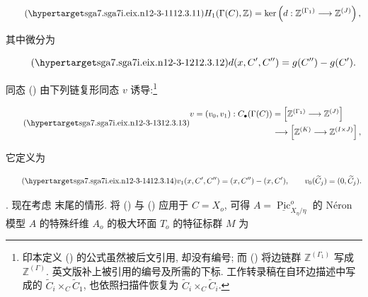 \begin{equation}\tag{\SGARefTarget{sga7.sga7i.eix.n12-3-11}{12.3.11}}
 H_1(\Gamma(C),\mathbb Z)=
 \ker\left(d:\mathbb Z^{(\Gamma_1)}\longrightarrow\mathbb Z^{(J)}\right),
\end{equation}

\noindent
其中微分为

\begin{equation}\tag{\SGARefTarget{sga7.sga7i.eix.n12-3-12}{12.3.12}}
 d(x,C',C'')=g(C'')-g(C').
\end{equation}

同态 () 由下列链复形同态 $v$ 诱导:\footnote{印本定义 () 的公式虽然被后文引用, 却没有编号; 而 () 将边链群 $\mathbb Z^{(\Gamma_1)}$ 写成 $\mathbb Z^{(\Gamma)}$. 英文版补上被引用的编号及所需的下标. 工作转录稿在自环边描述中写成的 $\widetilde C_i\times_C\widetilde C_1$, 也依照扫描件恢复为 $\widetilde C_i\times_C\widetilde C_i$.}

\begin{equation}\tag{\SGARefTarget{sga7.sga7i.eix.n12-3-13}{12.3.13}}
 \begin{split}
 v=(v_0,v_1):C_\bullet(\Gamma(C))
   &=\left[\mathbb Z^{(\Gamma_1)}\longrightarrow\mathbb Z^{(J)}\right]\\
   &\longrightarrow
     \left[\mathbb Z^{(K)}\longrightarrow\mathbb Z^{(I\times J)}\right],
 \end{split}
\end{equation}

\noindent
它定义为

\begin{equation}\tag{\SGARefTarget{sga7.sga7i.eix.n12-3-14}{12.3.14}}
 v_1(x,C',C'')=(x,C'')-(x,C'),
 \qquad
 v_0(\widetilde C_j)=(0,\widetilde C_j).
\end{equation}


\medskip
\noindent
{}. 现在考虑  末尾的情形. 将 () 与 () 应用于 $C=X_o$, 可得 $A=\underline{\operatorname{Pic}}^o_{X_\eta/\eta}$ 的 Néron 模型 $A$ 的特殊纤维 $A_o$ 的极大环面 $T_o$ 的特征标群 $M$ 为

